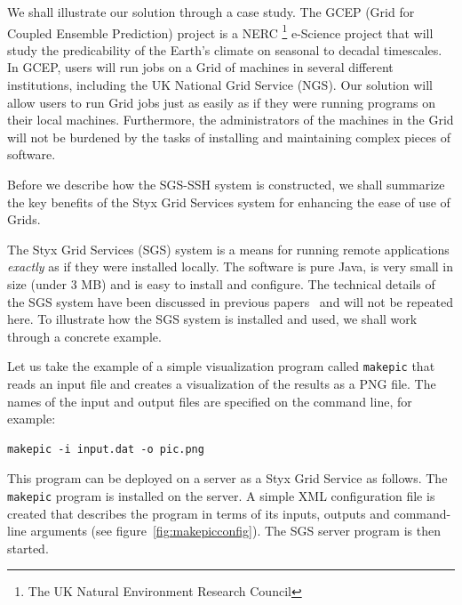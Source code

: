 \documentclass[times,10pt,twocolumn]{article}
\begin{document}
We shall illustrate our solution through a case study.  The GCEP (Grid for Coupled Ensemble Prediction) project is a NERC \footnote{The UK Natural Environment Research Council} e-Science project that will study the predicability of the Earth's climate on seasonal to decadal timescales.  In GCEP, users will run jobs on a Grid of machines in several different institutions, including the UK National Grid Service (NGS).  Our solution will allow users to run Grid jobs just as easily as if they were running programs on their local machines.  Furthermore, the administrators of the machines in the Grid will not be burdened by the tasks of installing and maintaining complex pieces of software.

Before we describe how the SGS-SSH system is constructed, we shall summarize the key benefits of the Styx Grid Services system for enhancing the ease of use of Grids.


The Styx Grid Services (SGS) system is a means for running remote applications {\em exactly\/} as if they were installed locally.  The software is pure Java, is very small in size (under 3 MB) and is easy to install and configure.  The technical details of the SGS system have been discussed in previous papers~\cite{blower:2005,blower:2006} and will not be repeated here.  To illustrate how the SGS system is installed and used, we shall work through a concrete example.

Let us take the example of a simple visualization program called {\tt makepic} that reads an input file and creates a visualization of the results as a PNG file.  The names of the input and output files are specified on the command line, for example:

\begin{verbatim}
makepic -i input.dat -o pic.png
\end{verbatim}

This program can be deployed on a server as a Styx Grid Service as follows.  The {\tt makepic} program is installed on the server.  A simple XML configuration file is created that describes the program in terms of its inputs, outputs and command-line arguments (see figure~\ref{fig:makepicconfig}).  The SGS server program is then started.
\end{document}

